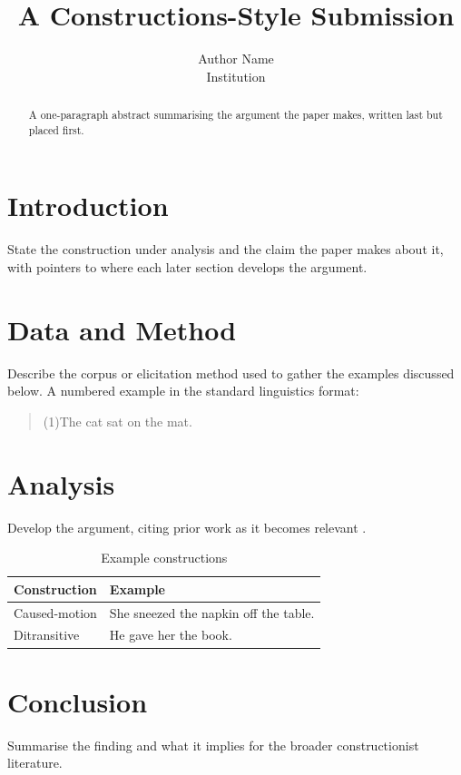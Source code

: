 \documentclass[11pt, a4paper]{article}
\title{A Constructions-Style Submission}
\author{Author Name \\ \small Institution}
\date{}
\begin{document}
\maketitle

\begin{abstract}
A one-paragraph abstract summarising the argument the paper makes,
written last but placed first.
\end{abstract}

\section{Introduction}

State the construction under analysis and the claim the paper makes
about it, with pointers to where each later section develops the
argument.

\section{Data and Method}

Describe the corpus or elicitation method used to gather the examples
discussed below. A numbered example in the standard linguistics format:

\begin{quote}
(1)\quad The cat sat on the mat.
\end{quote}

\section{Analysis}

Develop the argument, citing prior work as it becomes relevant
\citep{goldberg1995constructions}.

\begin{table}[ht]
\centering
\begin{tabular}{@{}ll@{}}
\toprule
Construction & Example \\
\midrule
Caused-motion & She sneezed the napkin off the table. \\
Ditransitive  & He gave her the book. \\
\bottomrule
\end{tabular}
\caption{Example constructions}
\label{tab:constructions}
\end{table}

\section{Conclusion}

Summarise the finding and what it implies for the broader constructionist
literature.


\end{document}
